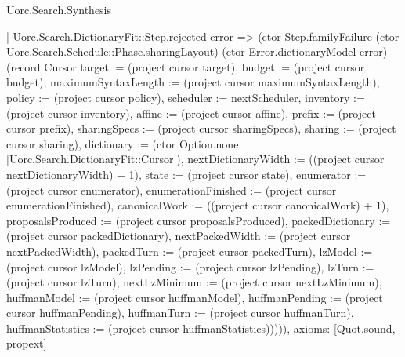 \begin{lexlean}{Uorc.Search.Synthesis}
\begin{semanticmodule}
{      | Uorc.Search.DictionaryFit::Step.rejected error => (ctor Step.familyFailure (ctor Uorc.Search.Schedule::Phase.sharingLayout) (ctor Error.dictionaryModel error) (record Cursor {target := (project cursor target), budget := (project cursor budget), maximumSyntaxLength := (project cursor maximumSyntaxLength), policy := (project cursor policy), scheduler := nextScheduler, inventory := (project cursor inventory), affine := (project cursor affine), prefix := (project cursor prefix), sharingSpecs := (project cursor sharingSpecs), sharing := (project cursor sharing), dictionary := (ctor Option.none [Uorc.Search.DictionaryFit::Cursor]), nextDictionaryWidth := ((project cursor nextDictionaryWidth) + 1), state := (project cursor state), enumerator := (project cursor enumerator), enumerationFinished := (project cursor enumerationFinished), canonicalWork := ((project cursor canonicalWork) + 1), proposalsProduced := (project cursor proposalsProduced), packedDictionary := (project cursor packedDictionary), nextPackedWidth := (project cursor nextPackedWidth), packedTurn := (project cursor packedTurn), lzModel := (project cursor lzModel), lzPending := (project cursor lzPending), lzTurn := (project cursor lzTurn), nextLzMinimum := (project cursor nextLzMinimum), huffmanModel := (project cursor huffmanModel), huffmanPending := (project cursor huffmanPending), huffmanTurn := (project cursor huffmanTurn), huffmanStatistics := (project cursor huffmanStatistics)})))),
  axioms: [Quot.sound, propext]
}


\end{semanticmodule}
\end{lexlean}
